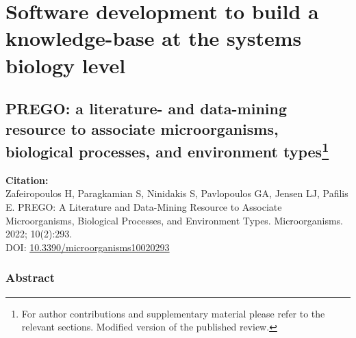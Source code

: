 % 
% 


\chapter{Software development to build a knowledge-base at the systems biology level}
\label{cha:prego}



\section[PREGO: a literature- and data-mining resource to associate microorganisms, biological processes, and environment types]{PREGO: a literature- and data-mining resource to associate microorganisms, biological processes, and environment types\footnote{
   For author contributions and supplementary material please refer to the relevant sections. 
   Modified version of the published review.
   }
}

\textbf{Citation:} \\ 
Zafeiropoulos H, Paragkamian S, Ninidakis S, Pavlopoulos GA, Jensen LJ, Pafilis E. PREGO: A Literature and Data-Mining Resource to Associate Microorganisms, Biological Processes, and Environment Types. Microorganisms. 2022; 10(2):293. \\ 
DOI: \href{https://doi.org/10.3390/microorganisms10020293}{10.3390/microorganisms10020293}



\subsection{Abstract}

